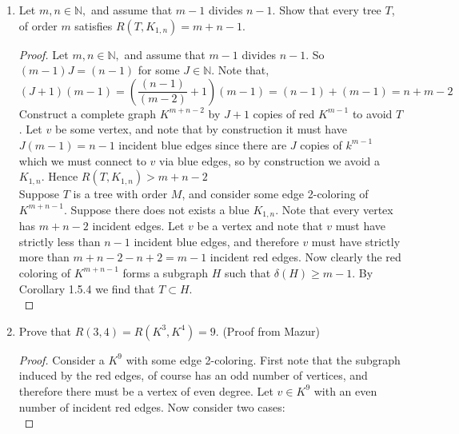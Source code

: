 \documentclass[12pt]{article}
\newcommand{\NN}{\mathbb{N}}
\begin{document}
\begin{enumerate}
	\item Let $m,n \in \mathbb{N},$ and assume that $m-1$ divides $n-1.$ Show that every tree $T$, of order $m$ satisfies $R(T,K_{1,n})=m+n-1.$
	\begin{proof} 
		Let $m,n \in \mathbb{N},$ and assume that $m-1$ divides $n-1$. So $(m - 1)J = (n - 1)$ for some $J \in \NN$. Note that, 
		\begin{equation*}
			(J + 1)(m - 1) = \left(\frac{(n - 1)}{(m- 2)} + 1\right)(m - 1) = (n - 1) + (m - 1) = n + m - 2
		\end{equation*}
		Construct a complete graph $K^{m + n - 2}$ by $J + 1$ copies of red $K^{m - 1}$ to avoid $T$. Let $v$ be some vertex, and note that by construction it must have $J(m - 1) = n - 1$ incident blue edges since there are $J$ copies of $k^{m - 1}$ which we must connect to $v$ via blue edges, so by construction we avoid a $K_{1, n}$. Hence $R(T, K_{1, n}) > m + n - 2$ \\



		

		Suppose $T$ is a tree with order $M$, and consider some edge 2-coloring of $K^{m + n - 1}$. Suppose there does not exists a blue $K_{1, n}$. Note that every vertex has $m + n - 2$ incident edges. Let $v$ be a vertex and note that $v$ must have strictly less than $n - 1$ incident blue edges, and therefore $v$ must have strictly more than $m + n - 2 - n + 2 = m - 1$ incident red edges. Now clearly the red coloring of $K^{m + n - 1}$ forms a subgraph $H$ such that $\delta(H) \geq m - 1$. By Corollary 1.5.4 we find that $T \subset H$.\\

	




	\end{proof}
	\newpage







	\item Prove that $R(3,4)=R(K^3,K^4)=9.$ (Proof from Mazur) 
	
	\begin{proof} Consider a $K^{9}$ with some edge 2-coloring. First note that the subgraph induced by the red edges, of course has an odd number of vertices, and therefore there must be a vertex of even degree. Let $v \in K^9$ with an even number of incident red edges. Now consider two cases: \\


\end{proof}
\end{enumerate}
\end{document}
